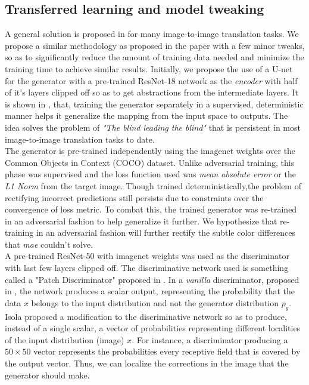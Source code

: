 \documentclass[10pt,twocolumn,letterpaper]{article}
\begin{document}
 \subsection{Transferred learning and model tweaking}
    \hspace*{0.167 in}A general solution is proposed in \cite{isola2018imagetoimage} for many image-to-image translation tasks. We propose a similar methodology as proposed in the paper with a few minor tweaks, so as to significantly reduce the amount of training data needed and minimize the training time to achieve similar results. Initially, we propose the use of a U-net for the generator with a pre-trained ResNet-18 network as the \textit{encoder} with half of it's layers clipped off so as to get abstractions from the intermediate layers. It is shown in \cite{ledig2017photorealistic}, that, training the generator separately in a supervised, deterministic manner helps it generalize the mapping from the input space to outputs. The idea solves the problem of \textit{"The blind leading the blind"} that is persistent in most image-to-image translation tasks to date. \\
    \hspace*{0.167 in}The generator is pre-trained independently using the imagenet weights over the Common Objects in Context (COCO) dataset. Unlike adversarial training, this phase was supervised and the loss function used was \textit{mean absolute error} or the \textit{L1 Norm} from the target image. Though trained deterministically,the problem of rectifying incorrect predictions still persists due to constraints over the convergence of loss metric. To combat this, the trained generator was re-trained in an adversarial fashion to help generalize it further. We hypothesize that re-training in an adversarial fashion will further rectify the subtle color differences that \textit{mae} couldn't solve.\\
    \hspace*{0.167 in}A pre-trained ResNet-50 with imagenet weights was used as the discriminator with last few layers clipped off. The discriminative network used is something called a "Patch Discriminator" proposed in \cite{isola2018imagetoimage}. In a \textit{vanilla} discriminator, proposed in \cite{goodfellow2014generative}, the network produces a scalar output, representing the probability that the data $x$ belongs to the input distribution and not the generator distribution $p_g$. Isola \etal\cite{isola2018imagetoimage} proposed a modification to the discriminative network so as to produce, instead of a single scalar, a vector of probabilities representing different localities of the input distribution (image) $x$. For instance, a discriminator producing a $50 \times 50$ vector represents the probabilities every receptive field that is covered by the output vector. Thus, we can localize the corrections in the image that the generator should make.\\
\end{document}

